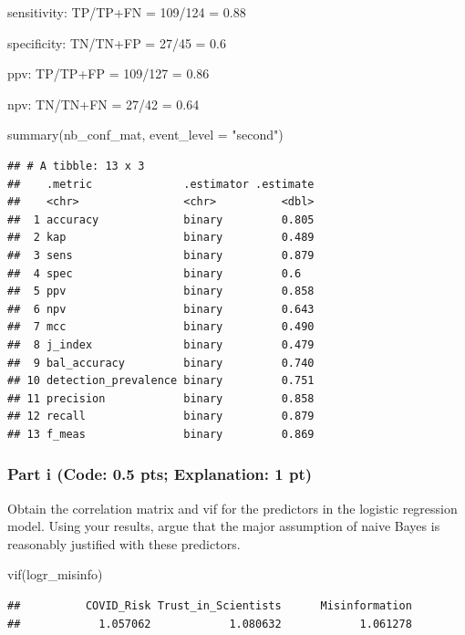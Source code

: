 \documentclass[
]{article}
\newenvironment{Shaded}{\begin{snugshade}}{\end{snugshade}}
\newcommand{\AttributeTok}[1]{\textcolor[rgb]{0.77,0.63,0.00}{#1}}
\newcommand{\FunctionTok}[1]{\textcolor[rgb]{0.00,0.00,0.00}{#1}}
\newcommand{\NormalTok}[1]{#1}
\newcommand{\StringTok}[1]{\textcolor[rgb]{0.31,0.60,0.02}{#1}}
\begin{document}
sensitivity: TP/TP+FN = 109/124 = 0.88

specificity: TN/TN+FP = 27/45 = 0.6

ppv: TP/TP+FP = 109/127 = 0.86

npv: TN/TN+FN = 27/42 = 0.64

\begin{Shaded}
\begin{Highlighting}[]
\FunctionTok{summary}\NormalTok{(nb\_conf\_mat, }\AttributeTok{event\_level =} \StringTok{"second"}\NormalTok{)}
\end{Highlighting}
\end{Shaded}

\begin{verbatim}
## # A tibble: 13 x 3
##    .metric              .estimator .estimate
##    <chr>                <chr>          <dbl>
##  1 accuracy             binary         0.805
##  2 kap                  binary         0.489
##  3 sens                 binary         0.879
##  4 spec                 binary         0.6  
##  5 ppv                  binary         0.858
##  6 npv                  binary         0.643
##  7 mcc                  binary         0.490
##  8 j_index              binary         0.479
##  9 bal_accuracy         binary         0.740
## 10 detection_prevalence binary         0.751
## 11 precision            binary         0.858
## 12 recall               binary         0.879
## 13 f_meas               binary         0.869
\end{verbatim}

\hypertarget{part-i-code-0.5-pts-explanation-1-pt}{%
\subsubsection{Part i (Code: 0.5 pts; Explanation: 1
pt)}\label{part-i-code-0.5-pts-explanation-1-pt}}

Obtain the correlation matrix and vif for the predictors in the logistic
regression model. Using your results, argue that the major assumption of
naive Bayes is reasonably justified with these predictors.

\begin{Shaded}
\begin{Highlighting}[]
\FunctionTok{vif}\NormalTok{(logr\_misinfo)}
\end{Highlighting}
\end{Shaded}

\begin{verbatim}
##          COVID_Risk Trust_in_Scientists      Misinformation 
##            1.057062            1.080632            1.061278
\end{verbatim}
\end{document}
